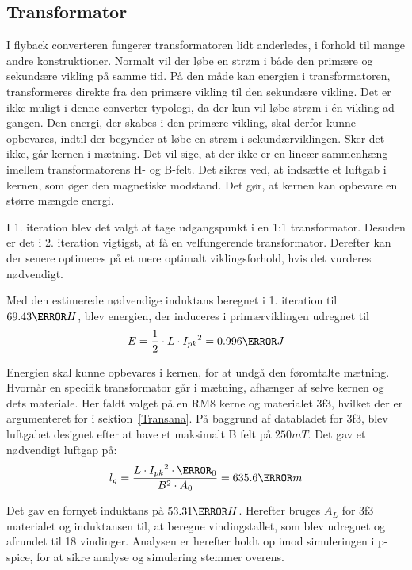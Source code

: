 \subsection{Transformator}
I flyback converteren fungerer transformatoren lidt anderledes, i forhold til mange andre konstruktioner. Normalt vil der løbe en strøm i både den primære og sekundære vikling på samme tid. På den måde kan energien i transformatoren, transformeres direkte fra den primære vikling til den sekundære vikling. Det er ikke muligt i denne converter typologi, da der kun vil løbe strøm i én vikling ad gangen. Den energi, der skabes i den primære vikling, skal derfor kunne opbevares, indtil der begynder at løbe en strøm i sekundærviklingen. Sker det ikke, går kernen i mætning. Det vil sige, at der ikke er en lineær sammenhæng imellem transformatorens H- og B-felt.
Det sikres ved, at indsætte et luftgab i kernen, som øger den magnetiske modstand. Det gør, at kernen kan opbevare en større mængde energi.

I 1. iteration blev det valgt at tage udgangspunkt i en 1:1 transformator. Desuden er det i 2. iteration vigtigst, at få en velfungerende transformator. Derefter kan der senere optimeres på et mere optimalt viklingsforhold, hvis det vurderes nødvendigt. 

Med den estimerede nødvendige induktans beregnet i 1. iteration til $69.43\micro H$, blev energien, der induceres i primærviklingen udregnet til \begin{equation} \label{Primary_energy}
E = \frac{1} {2} \cdot L \cdot {I_{pk}}^2 = 0.996\milli J
\end{equation}

Energien skal kunne opbevares i kernen, for at undgå den føromtalte mætning. Hvornår en specifik transformator går i mætning, afhænger af selve kernen og dets materiale. Her faldt valget på en RM8 kerne og materialet 3f3, hvilket der er argumenteret for i sektion~\ref{Transana}.
På baggrund af databladet for 3f3, blev luftgabet designet efter at have et maksimalt B felt på $250mT$. Det gav et nødvendigt luftgap på:
\begin{equation} \label{Airgap}
l_g = \frac{L \cdot {I_{pk}}^2 \cdot \micro_0}{B^2 \cdot A_0} = 635.6\micro m
\end{equation}

Det gav en fornyet induktans på $53.31\micro H$. Herefter bruges $A_L$ for 3f3 materialet og induktansen til, at beregne vindingstallet, som blev udregnet og afrundet til 18 vindinger.
Analysen er herefter holdt op imod simuleringen i p-spice, for at sikre analyse og simulering stemmer overens.
 
